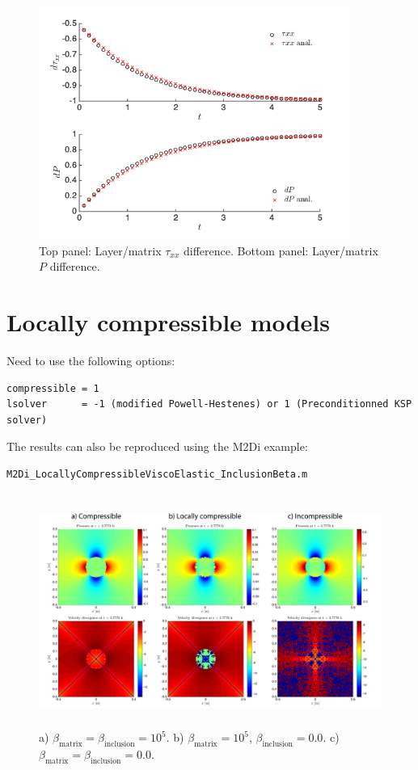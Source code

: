 \documentclass[12pt,english,openany]{scrbook}
\begin{document}
\begin{figure}[ht!]
\centerline{\includegraphics[height=3.0in]{./Figures/VangelisTest_MDOODZ}}
\caption{Top panel: Layer/matrix $\tau_{xx}$ difference. Bottom panel: Layer/matrix $P$ difference.}
\label{Vangelis}
\end{figure}

\section{Locally compressible models}

Need to use the following options:
\begin{verbatim} 
compressible = 1
lsolver      = -1 (modified Powell-Hestenes) or 1 (Preconditionned KSP solver)
\end{verbatim}

The results can also be reproduced using the M2Di example:
\begin{verbatim} 
M2Di_LocallyCompressibleViscoElastic_InclusionBeta.m
\end{verbatim}

\begin{figure}[ht!]
\centerline{\includegraphics[height=3.0in]{./Figures/LocallyCompressible_MDOODZ}}
\caption{a) $\beta_{\text{matrix}} = \beta_{\text{inclusion}} = 10^{5} $. b) $\beta_{\text{matrix}} = 10^{5} $, $\beta_{\text{inclusion}} = 0.0$. c) $\beta_{\text{matrix}} = \beta_{\text{inclusion}} = 0.0 $.}
\label{LocComp}
\end{figure}
\end{document}
